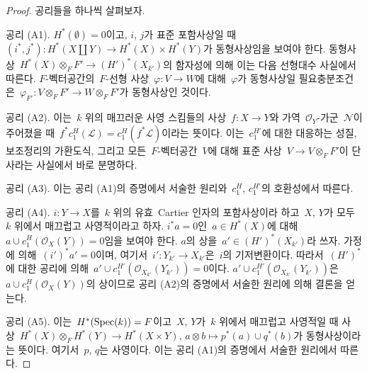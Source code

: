 \begin{proof}
공리들을 하나씩 살펴보자.

\medskip\noindent
공리 (A1). $H^*(\emptyset) = 0$이고, $i$, $j$가 표준
포함사상일 때\ 
$(i^*, j^*) : H^*(X \amalg Y) \to H^*(X) \times H^*(Y)$가
동형사상임을 보여야 한다. 동형사상\ 
$H^*(X) \otimes_F F' \to (H')^*(X_{k'})$의 함자성에 의해 이는
다음 선형대수 사실에서 따른다. $F$-벡터공간의\  $F$-선형 사상\ 
$\varphi : V \to W$에 대해\  $\varphi$가 동형사상일 필요충분조건은\ 
$\varphi_{F'} : V \otimes_F F' \to W \otimes_F F'$가
동형사상인 것이다.

\medskip\noindent
공리 (A2). 이는\  $k$ 위의 매끄러운 사영 스킴들의 사상\ 
$f : X \to Y$와 가역\  $\mathcal{O}_Y$-가군\  $\mathcal{N}$이
주어졌을 때\ 
$f^*c_1^H(\mathcal{L}) = c_1^H(f^*\mathcal{L})$이라는 뜻이다.
이는\  $c_1^{H'}$에 대한 대응하는 성질, 보조정리의 가환도식,
그리고 모든\  $F$-벡터공간\  $V$에 대해 표준 사상\ 
$V \to V \otimes_F F'$이 단사라는 사실에서 바로 분명하다.

\medskip\noindent
공리 (A3). 이는 공리 (A1)의 증명에서 서술한 원리와\  $c_1^H$,
$c_1^{H'}$의 호환성에서 따른다.

\medskip\noindent
공리 (A4). $i : Y \to X$를\  $k$ 위의 유효\  Cartier 인자의
포함사상이라 하고\  $X$, $Y$가 모두\  $k$ 위에서 매끄럽고 사영적이라고
하자. $i^*a = 0$인\  $a \in H^*(X)$에 대해\ 
$a \cup c_1^H(\mathcal{O}_X(Y)) = 0$임을 보여야 한다. $a$의 상을\ 
$a' \in (H')^*(X_{k'})$라 쓰자. 가정에 의해\ 
$(i')^*a' = 0$이며, 여기서\  $i' : Y_{k'} \to X_{k'}$은\  $i$의
기저변환이다. 따라서\  $(H')^*$에 대한 공리에 의해\ 
$a' \cup c_1^{H'}(\mathcal{O}_{X_{k'}}(Y_{k'})) = 0$이다.
$a' \cup c_1^{H'}(\mathcal{O}_{X_{k'}}(Y_{k'}))$은\ 
$a \cup c_1^H(\mathcal{O}_X(Y))$의 상이므로 공리 (A2)의 증명에서
서술한 원리에 의해 결론을 얻는다.

\medskip\noindent
공리 (A5). 이는\  $H^*(\mathop{\mathrm{Spec}}(k)) = F$이고\  $X$, $Y$가\  $k$ 위에서
매끄럽고 사영적일 때 사상\ 
$H^*(X) \otimes_F H^*(Y) \to H^*(X \times Y)$,
$a \otimes b \mapsto p^*(a) \cup q^*(b)$가 동형사상이라는 뜻이다.
여기서\  $p$, $q$는 사영이다. 이는 공리 (A1)의 증명에서 서술한
원리에서 따른다.


\end{proof}
